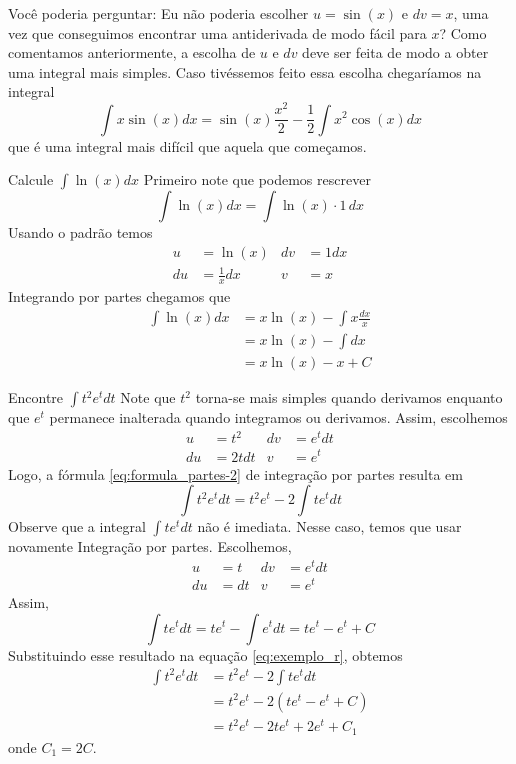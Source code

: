 Você poderia perguntar: Eu não poderia escolher $u= \sin(x)$ e $dv=x $, uma vez
que conseguimos encontrar uma antiderivada de modo fácil para $x$? Como
comentamos anteriormente, a escolha de $u$ e $dv$ deve ser feita de modo a
obter uma integral mais simples. Caso tivéssemos feito essa escolha chegaríamos
na integral
\[
    \int x \sin(x) dx= \sin(x) \frac{x^2}{2}- \frac{1}{2} \int x^2\cos(x)dx
\]
que é uma integral mais difícil que aquela que começamos.

\begin{example}
  Calcule \(\int \ln(x) dx\)
  \solution
  Primeiro note que podemos rescrever
  \[
    \int \ln(x) dx= \int \ln(x) \cdot 1\, dx
  \]
  Usando o padrão temos
  \begin{align*}
    u  & = \ln(x)        & dv & = 1 dx \\
    du & = \frac{1}{x}dx & v  & = x
  \end{align*}
  Integrando por partes chegamos que
  \begin{align*}
    \int \ln(x) dx
    & = x \ln(x)- \int  x \frac{dx}{x} \\
    & = x \ln(x)-\int dx \\
    & = x \ln(x)-x +C
  \end{align*}
\end{example}

\begin{example}
  Encontre \(\int t^2 e^t dt\)
  \solution
  Note que $t^2$ torna-se mais simples quando derivamos enquanto que
  $e^t$ permanece inalterada quando integramos ou derivamos.
  Assim, escolhemos
  \begin{align*}
    u  & = t^2  & dv & = e^t dt \\
    du & = 2tdt & v  & = e^t
  \end{align*}
  Logo, a fórmula \eqref{eq:formula_partes-2} de integração por partes
  resulta em
  \begin{equation}
    \label{eq:exemplo_r}
    \int t^2 e^t dt= t^2 e^t-2 \int te^t dt
  \end{equation}
  Observe que a integral \(\int te^t dt\) não é imediata.
  Nesse caso, temos que usar novamente Integração por partes.
  Escolhemos,
  \begin{align*}
    u  &= t  & dv & = e^t dt \\
    du &= dt & v  & = e^t
  \end{align*}
  Assim,
  \[
    \int te^t dt
    = t e^t - \int e^t dt
    = t e^t - e^t + C
  \]
  Substituindo esse resultado na equação \eqref{eq:exemplo_r}, obtemos
  \begin{align*}
    \int t^2 e^t dt
    & = t^2 e^t - 2\int te^tdt  \\
    & = t^2 e^t - 2(te^t-e^t+C) \\
    & = t^2 e^t - 2te^t+2e^t+C_1
  \end{align*}
  onde $C_1=2C$.
\end{example}

